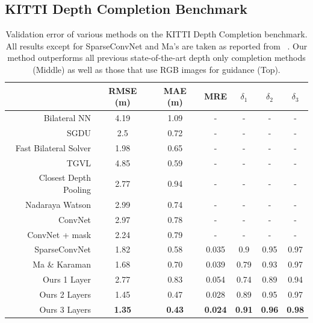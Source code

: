 \subsection{KITTI Depth Completion Benchmark}
\label{sec:kitti-depth-compl}
\begin{table}
\centering
\begin{tabular}{r|cccccc}
  \label{table:kitti}
  & RMSE (m) & MAE (m) & MRE & $\delta_1$ & $\delta_2$ & $\delta_3$\\\hline
  Bilateral NN\cite{Jampani2016CVPR} & 4.19 & 1.09 & - & - & - & -\\
  SGDU\cite{schneider2016semantically} & 2.5 & 0.72 & - & - & - & -\\
  Fast Bilateral Solver\cite{barron2016fast} & 1.98 & 0.65 & - & - & - & -\\
  TGVL\cite{Ferstl2013} & 4.85 & 0.59 & - & - & - & -\\\hline
  Closest Depth Pooling & 2.77 & 0.94 & - & - & - & -\\
  Nadaraya Watson\cite{Nadaraya,Watson} & 2.99 & 0.74 & - & - & - & -\\
  ConvNet & 2.97 & 0.78 & - & - & - & -\\
  ConvNet + mask & 2.24 & 0.79 & - & - & - & -\\
  SparseConvNet\cite{uhrig} & 1.82 & 0.58 & 0.035 & 0.9 & 0.95 & 0.97\\
  Ma \& Karaman\cite{sparsetodense}& 1.68 & 0.70 & 0.039 & 0.79 & 0.93 & 0.97\\\hline
  Ours 1 Layer & 2.77 & 0.83 & 0.054 & 0.74 & 0.89 & 0.94\\
  Ours 2 Layers & 1.45 & 0.47 & 0.028 & 0.89 & 0.95 & 0.97\\
  Ours 3 Layers & \textbf{1.35} & \textbf{0.43} & \textbf{0.024} & \textbf{0.91} & \textbf{0.96} & \textbf{0.98}\\
  \hline
 \end{tabular}
 \caption{Validation error of various methods on the KITTI Depth Completion benchmark. All results except for SparseConvNet and Ma's are taken as reported from ~\cite{uhrig}. Our method outperforms all previous state-of-the-art depth only completion methods (Middle) as well as those that use RGB images for guidance (Top).}
\label{fig:kitti}
\end{table}




